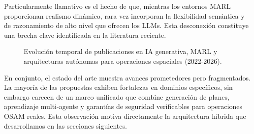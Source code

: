 Particularmente llamativo es el hecho de que, mientras los entornos MARL proporcionan realismo dinámico, rara vez incorporan la flexibilidad semántica y de razonamiento de alto nivel que ofrecen los LLMs. Esta desconexión constituye una brecha clave identificada en la literatura reciente.

\begin{figure}[t]
\centering
\scalebox{1}{}
\caption{Evolución temporal de publicaciones en IA generativa, MARL y arquitecturas autónomas para operaciones espaciales (2022-2026).}
\label{fig:publications_evolution}
\end{figure}

En conjunto, el estado del arte muestra avances prometedores pero fragmentados. La mayoría de las propuestas exhiben fortalezas en dominios específicos, sin embargo carecen de un marco unificado que combine generación de planes, aprendizaje multi-agente y garantías de seguridad verificables para operaciones OSAM reales. Esta observación motiva directamente la arquitectura híbrida que desarrollamos en las secciones siguientes.